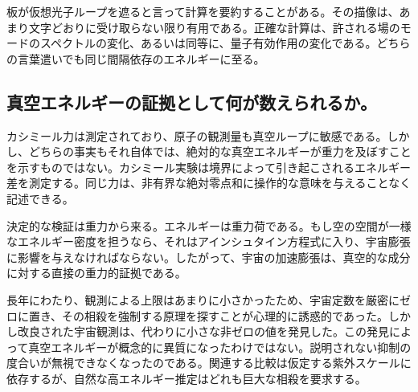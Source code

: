 板が仮想光子ループを遮ると言って計算を要約することがある。その描像は、あまり文字どおりに受け取らない限り有用である。正確な計算は、許される場のモードのスペクトルの変化、あるいは同等に、量子有効作用の変化である。どちらの言葉遣いでも同じ間隔依存のエネルギーに至る。

\begin{classroomqa}
\end{classroomqa}

\subsection{真空エネルギーの証拠として何が数えられるか。}

カシミール力は測定されており、原子の観測量も真空ループに敏感である。しかし、どちらの事実もそれ自体では、絶対的な真空エネルギーが重力を及ぼすことを示すものではない。カシミール実験は境界によって引き起こされるエネルギー差を測定する。同じ力は、非有界な絶対零点和に操作的な意味を与えることなく記述できる。

決定的な検証は重力から来る。エネルギーは重力荷である。もし空の空間が一様なエネルギー密度を担うなら、それはアインシュタイン方程式に入り、宇宙膨張に影響を与えなければならない。したがって、宇宙の加速膨張は、真空的な成分に対する直接の重力的証拠である。

\begin{classroomqa}
\end{classroomqa}

長年にわたり、観測による上限はあまりに小さかったため、宇宙定数を厳密にゼロに置き、その相殺を強制する原理を探すことが心理的に誘惑的であった。しかし改良された宇宙観測は、代わりに小さな非ゼロの値を発見した。この発見によって真空エネルギーが概念的に異質になったわけではない。説明されない抑制の度合いが無視できなくなったのである。関連する比較は仮定する紫外スケールに依存するが、自然な高エネルギー推定はどれも巨大な相殺を要求する。

